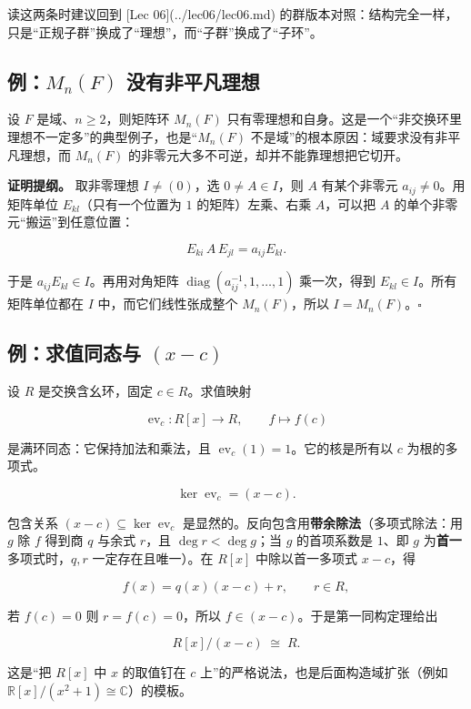 读这两条时建议回到 [Lec 06](../lec06/lec06.md) 的群版本对照：结构完全一样，只是“正规子群”换成了“理想”，而“子群”换成了“子环”。

\subsection{例：$M_n(F)$ 没有非平凡理想}


设 $F$ 是域、$n\ge2$，则矩阵环 $M_n(F)$ 只有零理想和自身。这是一个“非交换环里理想不一定多”的典型例子，也是“$M_n(F)$ 不是域”的根本原因：域要求没有非平凡理想，而 $M_n(F)$ 的非零元大多不可逆，却并不能靠理想把它切开。

\textbf{证明提纲。} 取非零理想 $I\ne(0)$，选 $0\ne A\in I$，则 $A$ 有某个非零元 $a_{ij}\ne0$。用矩阵单位 $E_{kl}$（只有一个位置为 $1$ 的矩阵）左乘、右乘 $A$，可以把 $A$ 的单个非零元“搬运”到任意位置：

\[
E_{ki}\,A\,E_{jl}=a_{ij}E_{kl}.
\]

于是 $a_{ij}E_{kl}\in I$。再用对角矩阵 $\operatorname{diag}(a_{ij}^{-1},1,\dots,1)$ 乘一次，得到 $E_{kl}\in I$。所有矩阵单位都在 $I$ 中，而它们线性张成整个 $M_n(F)$，所以 $I=M_n(F)$。$\square$

\subsection{例：求值同态与 $(x-c)$}


设 $R$ 是交换含幺环，固定 $c\in R$。求值映射

\[
\operatorname{ev}_c:R[x]\longrightarrow R,\qquad f\longmapsto f(c)
\]

是满环同态：它保持加法和乘法，且 $\operatorname{ev}_c(1)=1$。它的核是所有以 $c$ 为根的多项式。

\[
\ker\operatorname{ev}_c=(x-c).
\]

包含关系 $(x-c)\subseteq\ker\operatorname{ev}_c$ 是显然的。反向包含用\textbf{带余除法}（多项式除法：用 $g$ 除 $f$ 得到商 $q$ 与余式 $r$，且 $\deg r<\deg g$；当 $g$ 的首项系数是 $1$、即 $g$ 为\textbf{首一}多项式时，$q,r$ 一定存在且唯一）。在 $R[x]$ 中除以首一多项式 $x-c$，得

\[
f(x)=q(x)(x-c)+r,\qquad r\in R,
\]

若 $f(c)=0$ 则 $r=f(c)=0$，所以 $f\in(x-c)$。于是第一同构定理给出

\[
R[x]/(x-c)\;\cong\;R .
\]

这是“把 $R[x]$ 中 $x$ 的取值钉在 $c$ 上”的严格说法，也是后面构造域扩张（例如 $\mathbb R[x]/(x^2+1)\cong\mathbb C$）的模板。

